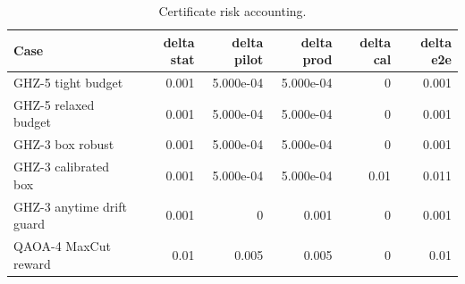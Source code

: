 \begin{table}[t]
\centering
\caption{Certificate risk accounting.}
\label{tab:risk-accounting}
\begin{tabular}{lrrrrr}
\hline
Case & delta stat & delta pilot & delta prod & delta cal & delta e2e \\
\hline
GHZ-5 tight budget & 0.001 & 5.000e-04 & 5.000e-04 & 0 & 0.001 \\
GHZ-5 relaxed budget & 0.001 & 5.000e-04 & 5.000e-04 & 0 & 0.001 \\
GHZ-3 box robust & 0.001 & 5.000e-04 & 5.000e-04 & 0 & 0.001 \\
GHZ-3 calibrated box & 0.001 & 5.000e-04 & 5.000e-04 & 0.01 & 0.011 \\
GHZ-3 anytime drift guard & 0.001 & 0 & 0.001 & 0 & 0.001 \\
QAOA-4 MaxCut reward & 0.01 & 0.005 & 0.005 & 0 & 0.01 \\
\hline
\end{tabular}
\end{table}
